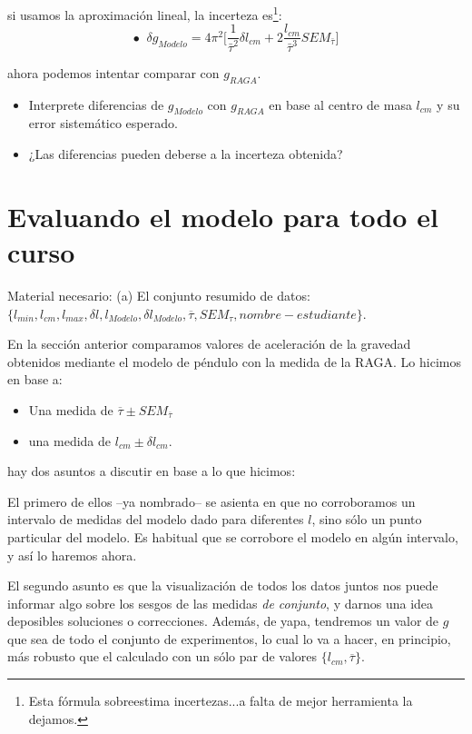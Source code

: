 \documentclass[10pt,a4paper]{article}
\numberwithin{equation}{section}%
\numberwithin{equation}{subsection}
\begin{document}
\noindent si usamos la aproximación lineal, la incerteza es\footnote{Esta fórmula sobreestima incertezas...a falta de mejor herramienta la dejamos.}:
$$
\bullet \; \; \delta g_{Modelo} = 4 \pi^2 \Big[ \frac{1}{\bar{\tau}^2} \delta l_{cm} + 2 \frac{ l_{cm}}{\bar{\tau}^3} SEM_{\bar{\tau}} \Big]
$$

\noindent ahora podemos intentar comparar con $g_{RAGA}$.

\begin{itemize}
\item[\textbf{a)}]  Interprete diferencias de $g_{Modelo}$ con $g_{RAGA}$ en base al centro de masa $l_{cm}$ y su error sistemático esperado.
\item[\textbf{b)}] ¿Las diferencias pueden deberse a la incerteza obtenida?
\end{itemize}




\pagebreak

\section{Evaluando el modelo para todo el curso}
\begin{small}
Material necesario:
(a)  El conjunto resumido de datos:  $\{l_{min},l_{cm},l_{max},\delta l,l_{Modelo},\delta l_{Modelo}, \overline{\tau}, SEM_{\tau}, nombre-estudiante\}$.
\end{small}

En la sección anterior comparamos valores de aceleración de la gravedad obtenidos mediante el modelo de péndulo con la medida de la RAGA. Lo hicimos en base a:

\begin{itemize}
\item[$\bullet$] Una medida de $\overline{\tau} \pm SEM_{\overline{\tau}}$
\item[$\bullet$] una medida de $l_{cm} \pm \delta l_{cm}$.
\end{itemize}

\noindent hay dos asuntos a discutir en base a lo que hicimos:

El primero de ellos --ya nombrado-- se asienta en que no corroboramos un intervalo de medidas del modelo dado para diferentes $l$, sino sólo un punto particular del modelo. Es habitual que se corrobore el modelo en algún intervalo, y así lo haremos ahora.

El segundo asunto es que la visualización de todos los datos juntos nos puede informar algo sobre los sesgos de las medidas \textit{de conjunto}, y darnos una idea deposibles soluciones o correcciones. Además, de yapa, tendremos un valor de $g$ que sea de todo el conjunto de experimentos, lo cual lo va a hacer, en principio, más robusto que el calculado con un sólo par de valores $\{ l_{cm}, \overline{\tau} \}$.
\end{document}
